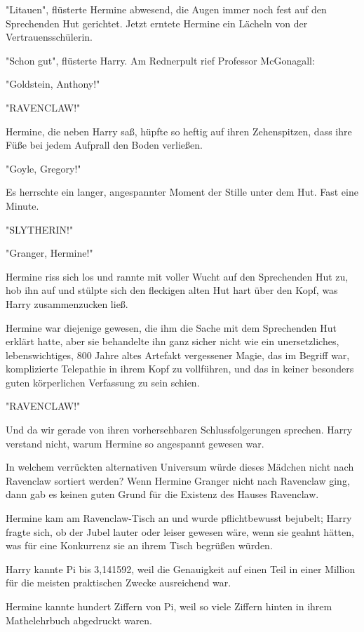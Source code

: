 {"Litauen", flüsterte Hermine abwesend, die Augen immer noch fest auf den Sprechenden Hut gerichtet. Jetzt erntete Hermine ein Lächeln von der Vertrauensschülerin.

"Schon gut", flüsterte Harry. Am Rednerpult rief Professor McGonagall:

"Goldstein, Anthony!"

"RAVENCLAW!"

Hermine, die neben Harry saß, hüpfte so heftig auf ihren Zehenspitzen, dass ihre Füße bei jedem Aufprall den Boden verließen.

"Goyle, Gregory!"

Es herrschte ein langer, angespannter Moment der Stille unter dem Hut. Fast eine Minute.

"SLYTHERIN!"

"Granger, Hermine!"

Hermine riss sich los und rannte mit voller Wucht auf den Sprechenden Hut zu, hob ihn auf und stülpte sich den fleckigen alten Hut hart über den Kopf, was Harry zusammenzucken ließ.

Hermine war diejenige gewesen, die ihm die Sache mit dem Sprechenden Hut erklärt hatte, aber sie behandelte ihn ganz sicher nicht wie ein unersetzliches, lebenswichtiges, 800 Jahre altes Artefakt vergessener Magie, das im Begriff war, komplizierte Telepathie in ihrem Kopf zu vollführen, und das in keiner besonders guten körperlichen Verfassung zu sein schien.

"RAVENCLAW!"

Und da wir gerade von ihren vorhersehbaren Schlussfolgerungen sprechen. Harry verstand nicht, warum Hermine so angespannt gewesen war.

In welchem verrückten alternativen Universum würde dieses Mädchen nicht nach Ravenclaw sortiert werden? Wenn Hermine Granger nicht nach Ravenclaw ging, dann gab es keinen guten Grund für die Existenz des Hauses Ravenclaw.

Hermine kam am Ravenclaw-Tisch an und wurde pflichtbewusst bejubelt; Harry fragte sich, ob der Jubel lauter oder leiser gewesen wäre, wenn sie geahnt hätten, was für eine Konkurrenz sie an ihrem Tisch begrüßen würden.

Harry kannte Pi bis 3,141592, weil die Genauigkeit auf einen Teil in einer Million für die meisten praktischen Zwecke ausreichend war.

Hermine kannte hundert Ziffern von Pi, weil so viele Ziffern hinten in ihrem Mathelehrbuch abgedruckt waren.

}
